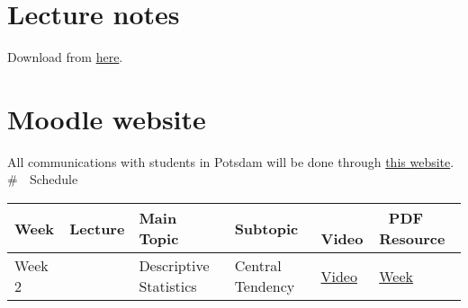 \documentclass[
  letterpaper,
  DIV=11,
  numbers=noendperiod]{scrreprt}
\begin{document}
\section{Lecture notes}\label{lecture-notes}

Download from
\href{https://drive.google.com/drive/folders/1H-jQNOqS3PLgdXADRYF7ag-WqN_tK4qc?usp=share_link}{here}.

\section{Moodle website}\label{moodle-website}

All communications with students in Potsdam will be done through
\href{https://moodle2.uni-potsdam.de/course/view.php?id=17526}{this
website}. \# 📘 Schedule

\begin{longtable}[]{@{}
  >{\raggedright\arraybackslash}p{}
  >{\raggedright\arraybackslash}p{}
  >{\raggedright\arraybackslash}p{}
  >{\raggedright\arraybackslash}p{}
  >{\raggedright\arraybackslash}p{}
  >{\raggedright\arraybackslash}p{}@{}}
\toprule\noalign{}
\begin{minipage}[b]{\linewidth}\raggedright
\textbf{Week}
\end{minipage} & \begin{minipage}[b]{\linewidth}\raggedright
\textbf{Lecture}
\end{minipage} & \begin{minipage}[b]{\linewidth}\raggedright
\textbf{Main Topic}
\end{minipage} & \begin{minipage}[b]{\linewidth}\raggedright
\textbf{Subtopic}
\end{minipage} & \begin{minipage}[b]{\linewidth}\raggedright
\textbf{🎥 Video}
\end{minipage} & \begin{minipage}[b]{\linewidth}\raggedright
\textbf{📄 PDF Resource}
\end{minipage} \\
\midrule\noalign{}
\endhead
\bottomrule\noalign{}
\endlastfoot
Week 2 & 1 & Descriptive Statistics & Central Tendency &
\href{https://youtu.be/9709cbHi4-8?t=173}{Video} &
\href{https://drive.google.com/file/d/1CXkLjlvsMt6-BcrDLrNPsTt6SIUSq7NG/view}{Week
}
\end{longtable}
\end{document}
